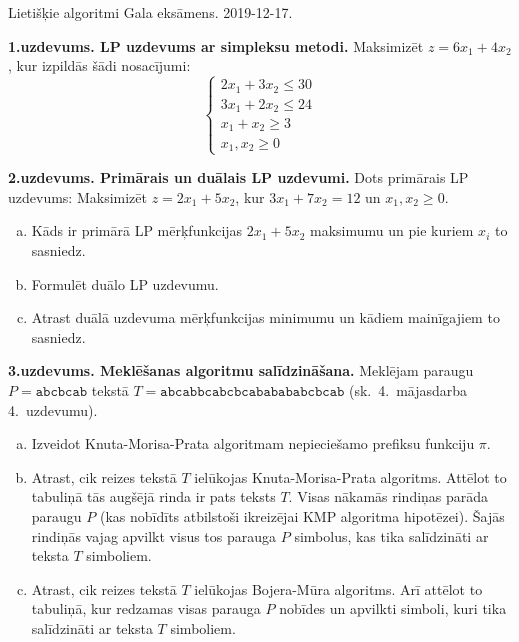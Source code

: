 \documentclass[11pt]{article}
\begin{document}
\thispagestyle{empty}

{\Large Lietišķie algoritmi \textendash{} Gala eksāmens. 2019-12-17.}


\noindent
{\bf 1.uzdevums. LP uzdevums ar simpleksu metodi.}  
Maksimizēt $z = 6x_1 + 4x_2$, kur izpildās šādi nosacījumi:
$$\left\{ \begin{array}{l}
2x_1 + 3x_2 \leq 30\\
3x_1 + 2x_2 \leq 24\\
x_1 + x_2 \geq 3\\
x_1,x_2 \geq 0
\end{array} \right.$$

\vspace{6pt}
{\bf 2.uzdevums. Primārais un duālais LP uzdevumi.}
Dots primārais LP uzdevums: Maksimizēt $z = 2 x_1 + 5 x_2$, 
kur $3 x_1 + 7x_2  = 12$ un $x_1, x_2 \geq 0$. 
\begin{enumerate}[(a)]
\item Kāds ir primārā LP mērķfunkcijas $2x_1 + 5x_2$ maksimumu un pie kuriem $x_i$ to sasniedz.
\item Formulēt duālo LP uzdevumu. 
\item Atrast duālā uzdevuma mērķfunkcijas minimumu un kādiem mainīgajiem to sasniedz.
\end{enumerate}


\vspace{6pt}
{\bf 3.uzdevums. Meklēšanas algoritmu salīdzināšana.} Meklējam paraugu $P = \mathtt{abcbcab}$
tekstā $T = \mathtt{abcabbcabcbcababababcbcab}$ (sk.\ 4.\ mājasdarba 4.\ uzdevumu). 
\begin{enumerate}[(a)]
\item Izveidot Knuta-Morisa-Prata algoritmam nepieciešamo prefiksu funkciju $\pi$. 
\item Atrast, cik reizes tekstā $T$ ielūkojas
Knuta-Morisa-Prata algoritms. Attēlot to tabuliņā \textendash{} 
tās augšējā rinda ir pats teksts $T$. 
Visas nākamās rindiņas parāda paraugu $P$ (kas nobīdīts
atbilstoši ikreizējai KMP algoritma hipotēzei). 
Šajās rindiņās vajag apvilkt visus tos parauga $P$ 
simbolus, kas tika salīdzināti ar teksta $T$ simboliem. 
\item Atrast, cik reizes tekstā $T$ ielūkojas
Bojera-Mūra algoritms. Arī attēlot to tabuliņā, kur 
redzamas visas parauga $P$ nobīdes un apvilkti simboli, 
kuri tika salīdzināti ar teksta $T$ simboliem. 
\end{enumerate}
\end{document}
